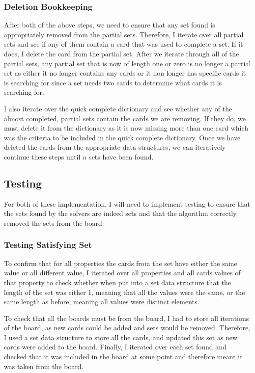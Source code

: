 \documentclass[pageno]{jpaper}
\begin{document}
\subsubsection{Deletion Bookkeeping}

After both of the above steps, we need to ensure that any set found is appropriately removed from the partial sets. Therefore, I iterate over all partial sets and see if any of them contain a card that was used to complete a set. If it does, I delete the card from the partial set. After we iterate through all of the partial sets, any partial set that is now of length one or zero is no longer a partial set as either it no longer contains any cards or it non longer has specific cards it is searching for since a set needs two cards to determine what cards it is searching for.

I also iterate over the quick complete dictionary and see whether any of the almost completed, partial sets contain the cards we are removing. If they do, we must delete it from the dictionary as it is now missing more than one card which was the criteria to be included in the quick complete dictionary. Once we have deleted the cards from the appropriate data structures, we can iteratively continue these steps until $n$ sets have been found. 

\subsection{Testing}

For both of these implementation, I will need to implement testing to ensure that the sets found by the solvers are indeed sets and that the algorithm correctly removed the sets from the board. 

\subsubsection{Testing Satisfying Set}

To confirm that for all properties the cards from the set have either the same value or all different value, I iterated over all properties and all cards values of that property to check whether when put into a set data structure that the length of the set was either 1, meaning that all the values were the same, or the same length as before, meaning all values were distinct elements. 

To check that all the boards must be from the board, I had to store all iterations of the board, as new cards could be added and sets would be removed. Therefore, I used a set data structure to store all the cards, and updated this set as new cards were added to the board. Finally, I iterated over each set found and checked that it was included in the board at some point and therefore meant it was taken from the board. 
\end{document}
